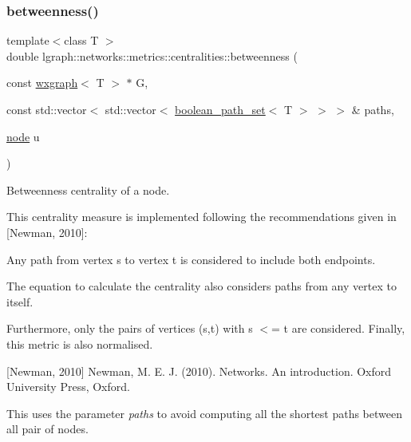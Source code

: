 \subsubsection{\texorpdfstring{betweenness()}{betweenness()}\hspace{0.1cm}{\footnotesize\ttfamily [4/8]}}
{\footnotesize\ttfamily template$<$class T $>$ \\
double lgraph\+::networks\+::metrics\+::centralities\+::betweenness (\begin{DoxyParamCaption}\item[{const \hyperlink{classlgraph_1_1wxgraph}{wxgraph}$<$ T $>$ $\ast$}]{G,  }\item[{const std\+::vector$<$ std\+::vector$<$ \hyperlink{namespacelgraph_afad432931ba600ab1628d5c9595986c5}{boolean\+\_\+path\+\_\+set}$<$ T $>$ $>$ $>$ \&}]{paths,  }\item[{\hyperlink{namespacelgraph_a397169dd66adf725210a30fb7251773e}{node}}]{u }\end{DoxyParamCaption})}



Betweenness centrality of a node. 

This centrality measure is implemented following the recommendations given in \mbox{[}Newman, 2010\mbox{]}\+:
\begin{DoxyItemize}
\item Any path from vertex \textquotesingle{}s\textquotesingle{} to vertex \textquotesingle{}t\textquotesingle{} is considered to include both endpoints.
\item The equation to calculate the centrality also considers paths from any vertex to itself.
\end{DoxyItemize}

Furthermore, only the pairs of vertices (s,t) with s $<$= t are considered. Finally, this metric is also normalised.

\mbox{[}Newman, 2010\mbox{]} Newman, M. E. J. (2010). Networks. An introduction. Oxford University Press, Oxford.

This uses the parameter {\itshape paths} to avoid computing all the shortest paths between all pair of nodes.


